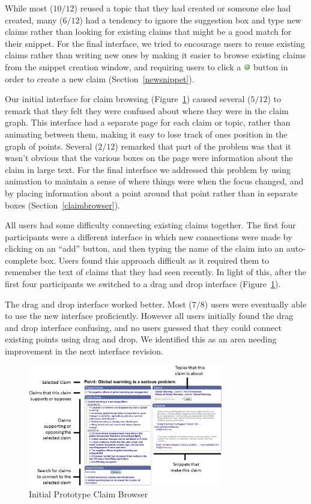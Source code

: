 \documentclass{chi2009}
\begin{document}
While most ($10/12$) reused a topic that they had created or someone else had created, many ($6/12$) had a tendency to ignore the suggestion box and type new claims rather than looking for existing claims that might be a good match for their snippet. For the final interface, we tried to encourage users to reuse existing claims rather than writing new ones by making it easier to browse existing claims from the snippet creation window, and requiring users to click a \includegraphics[width=0.3cm]{../images/add.png} button in order to create a new claim (Section~\ref{newsnippet}). 

Our initial interface for claim browsing (Figure~\ref{oldbrowser}) caused several ($5/12$) to remark that they felt they were confused about where they were in the claim graph. This interface had a separate page for each claim or topic, rather than animating between them, making it easy to lose track of ones position in the graph of points. Several ($2/12$) remarked that part of the problem was that it wasn't obvious that the various boxes on the page were information about the claim in large text. For the final interface we addressed this problem by using animation to maintain a sense of where things were when the focus changed, and by placing information about a point around that point rather than in separate boxes (Section~\ref{claimbrowser}).

All users had some difficulty connecting existing claims together. The first four participants were a different interface in which new connections were made by clicking on an ``add'' button, and then typing the name of the claim into an auto-complete box. Users found this approach difficult as it required them to remember the text of claims that they had seen recently. In light of this, after the first four participants we switched to a drag and drop interface (Figure~\ref{oldbrowser}).

The drag and drop interface worked better. Most ($7/8$) users were eventually able to use the new interface proficiently. However all users initially found the drag and drop interface confusing, and no users guessed that they could connect existing points using drag and drop. We identified this as an area needing improvement in the next interface revision.


\begin{figure}[ht]
	\includegraphics[width=8.5cm]{../screenshots/oldpoint_diagram.png}
	\caption{Initial Prototype Claim Browser}
	\label{oldbrowser}
\end{figure}
\end{document}
